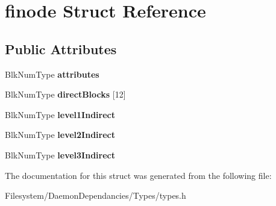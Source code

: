\hypertarget{structfinode}{}\section{finode Struct Reference}
\label{structfinode}
\subsection*{Public Attributes}
\begin{DoxyCompactItemize}
\item 
\mbox{\label{structfinode_acea49fb643c2e6a421d4d4ed674fe2c8}} 
Blk\+Num\+Type {\bfseries attributes}
\item 
\mbox{\label{structfinode_ad2e7c7bf4f5653afac46fb609f4a04bd}} 
Blk\+Num\+Type {\bfseries direct\+Blocks} \mbox{[}12\mbox{]}
\item 
\mbox{\label{structfinode_a0d707b42974c4777cd5ff71e3b70ed5a}} 
Blk\+Num\+Type {\bfseries level1\+Indirect}
\item 
\mbox{\label{structfinode_a758697bad925160db4e1e08b1d51550c}} 
Blk\+Num\+Type {\bfseries level2\+Indirect}
\item 
\mbox{\label{structfinode_a6c3fe6a69987a36fdfeae3acc8904edb}} 
Blk\+Num\+Type {\bfseries level3\+Indirect}
\end{DoxyCompactItemize}


The documentation for this struct was generated from the following file\+:\begin{DoxyCompactItemize}
\item 
Filesystem/\+Daemon\+Dependancies/\+Types/types.\+h\end{DoxyCompactItemize}
